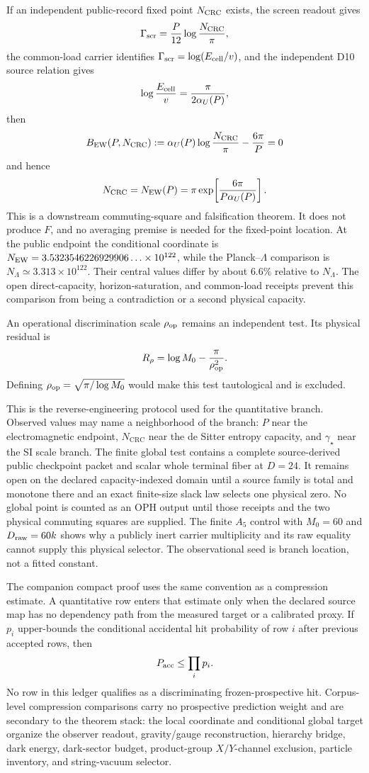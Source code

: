\documentclass[11pt]{article}
\begin{document}
If an independent public-record fixed point \(N_{\rm CRC}\) exists, the screen
readout gives
\[
\Gamma_{\rm scr}=\frac{P}{12}\log\frac{N_{\rm CRC}}{\pi},
\]
the common-load carrier identifies
\(\Gamma_{\rm scr}=\log(E_{\rm cell}/v)\), and the independent D10 source
relation gives
\[
\log\frac{E_{\rm cell}}v=\frac{\pi}{2\alpha_U(P)},
\]
then
\[
B_{\rm EW}(P,N_{\rm CRC})
:=\alpha_U(P)\log\frac{N_{\rm CRC}}{\pi}-\frac{6\pi}{P}=0
\]
and hence
\[
N_{\rm CRC}=N_{\rm EW}(P)
=\pi\exp\!\left[\frac{6\pi}{P\alpha_U(P)}\right].
\]
This is a downstream commuting-square and falsification theorem. It does not
produce \(F\), and no averaging premise is needed for the fixed-point location.
At the public endpoint the conditional coordinate is
\(N_{\rm EW}=3.5323546226929906\ldots\times10^{122}\), while the
Planck--\(\Lambda\) comparison is
\(N_{\Lambda}\simeq3.313\times10^{122}\). Their central values differ by about
\(6.6\%\) relative to \(N_\Lambda\). The open direct-capacity,
horizon-saturation, and common-load receipts prevent this comparison from
being a contradiction or a second physical capacity.

An operational discrimination scale \(\rho_{\rm op}\) remains an independent
test. Its physical residual is
\[
R_\rho=\log M_0-\frac{\pi}{\rho_{\rm op}^2}.
\]
Defining \(\rho_{\rm op}=\sqrt{\pi/\log M_0}\) would make this test
tautological and is excluded.

This is the reverse-engineering protocol used for the quantitative branch. Observed values may
name a neighborhood of the branch: \(P\) near the electromagnetic endpoint, \(N_{\mathrm{CRC}}\)
near the de Sitter entropy capacity, and \(\gamma_\star\) near the SI scale
branch. The finite global test contains a complete source-derived public
checkpoint packet and scalar whole terminal fiber at \(D=24\). It remains
open on the declared capacity-indexed domain until a source family is total
and monotone there and an exact finite-size slack law selects one physical
zero.
No global point is counted as an OPH output until those receipts and the two
physical commuting squares are supplied. The finite \(A_5\) control with
\(M_0=60\) and \(D_{\rm raw}=60k\) shows why a publicly inert carrier
multiplicity and its raw equality cannot supply this physical selector. The observational seed is branch
location, not a fitted constant.

The companion compact proof uses the same convention as a compression
estimate. A quantitative row enters that estimate only when the declared source
map has no dependency path from the measured target or a calibrated proxy. If
\(p_i\) upper-bounds the conditional accidental hit probability of row \(i\)
after previous accepted rows, then
\[
P_{\rm acc}\le\prod_i p_i .
\]
No row in this ledger qualifies as a discriminating frozen-prospective hit.
Corpus-level compression comparisons carry no prospective prediction weight and are secondary
to the theorem stack: the
local coordinate and conditional global target organize the observer readout,
gravity/gauge reconstruction, hierarchy bridge, dark energy, dark-sector
budget, product-group \(X/Y\)-channel exclusion, particle inventory, and
string-vacuum selector.
\end{document}
